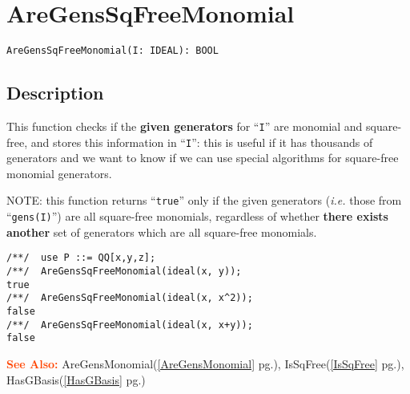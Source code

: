 \documentclass[a4paper]{mybook}
\newenvironment{command}{}{} %
\newcommand\SeeAlso{\par\textcolor{OrangeRed}{\textbf{\large See Also: }}}
\begin{document}
\section{AreGensSqFreeMonomial}
\label{AreGensSqFreeMonomial}
\begin{command} %


\begin{Verbatim}[label=syntax, rulecolor=\color{MidnightBlue},
frame=single]
AreGensSqFreeMonomial(I: IDEAL): BOOL
\end{Verbatim}


\subsection*{Description}

This function checks if the \textbf{given generators} for ``\verb&I&'' are
monomial and square-free, and stores this information in ``\verb&I&'':
this is useful if it has thousands of generators and we want to know
if we can use special algorithms for square-free monomial generators.
\par 
NOTE: this function returns ``\verb&true&'' only if the given generators
(\textit{i.e.} those from ``\verb&gens(I)&'') are all square-free monomials,
regardless of whether \textbf{there exists another} set of generators which are
all square-free monomials.
\begin{Verbatim}[label=example, rulecolor=\color{PineGreen}, frame=single]
/**/  use P ::= QQ[x,y,z];
/**/  AreGensSqFreeMonomial(ideal(x, y));
true
/**/  AreGensSqFreeMonomial(ideal(x, x^2));
false
/**/  AreGensSqFreeMonomial(ideal(x, x+y));
false
\end{Verbatim}


\SeeAlso %
  AreGensMonomial(\ref{AreGensMonomial} pg.\pageref{AreGensMonomial}), 
    IsSqFree(\ref{IsSqFree} pg.\pageref{IsSqFree}), 
    HasGBasis(\ref{HasGBasis} pg.\pageref{HasGBasis})
\end{command} %
\end{document}
